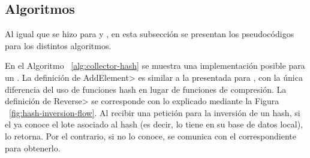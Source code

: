 
\subsection{Algoritmos}\label{subsubsec:details}

Al igual que se hizo para \vanilla y \compresschain, en esta subsección se presentan los pseudocódigos
para los distintos algoritmos. 


En el Algoritmo ~\ref{alg:collector-hash} se muestra una implementación posible para un
\hcollector.
%
La definición de \<AddElement> es similar a la presentada para \compresschain,
con la única diferencia del uso de funciones hash en lugar de funciones de compresión.
%
La definición de \<Reverse> se corresponde con lo explicado mediante la Figura ~\ref{fig:hash-inversion-flow}.
%
Al recibir una petición para la inversión de un hash, si el \hcollector ya conoce el lote asociado al hash
(es decir, lo tiene en su base de datos local), lo retorna.
%
Por el contrario, si no lo conoce, se comunica con el \hcollector correspondiente para obtenerlo.  


